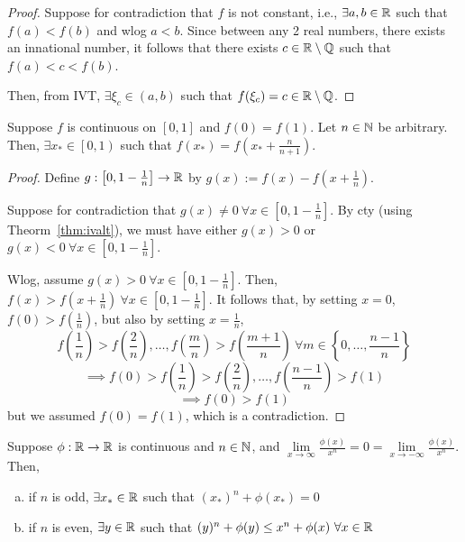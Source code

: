 \begin{proof}
    Suppose for contradiction that $f$ is not constant, i.e., $\exists a, b \in \mathbb R$ such that $f(a) < f(b)$ and wlog $a < b$.
    Since between any 2 real numbers, there exists an innational number, it follows that there exists $c \in \mathbb R \setminus \mathbb Q$ such that $f(a) < c < f(b)$.

    Then, from IVT, $\exists \xi_c \in (a, b)$ such that $f(\xi_c) = c \in \mathbb R \setminus \mathbb Q$.
\end{proof}

\begin{example}
    Suppose $f$ is continuous on $\left[0, 1\right]$ and $f(0) = f(1)$. Let $n \in \mathbb N$ be arbitrary.
    Then, $\exists x_* \in \left[0, 1\right)$ such that $f(x_*) = f\left(x_* + \frac{n}{n+1}\right)$. 
\end{example}

\begin{proof}
    Define $g: \left[0, 1 - \frac{1}{n}\right] \to \mathbb R$ by $g(x) := f(x) - f\left(x + \frac{1}{n}\right)$.

    Suppose for contradiction that $g(x) \neq 0\ \forall x \in \left[0, 1 - \frac{1}{n}\right]$.
    By cty (using Theorm~\ref{thm:ivalt}), we must have either $g(x) > 0$ or $g(x) < 0\ \forall x \in \left[0, 1 - \frac{1}{n}\right]$.

    Wlog, assume $g(x) > 0\ \forall x \in \left[0, 1 - \frac{1}{n}\right]$.
    Then, $f(x) > f\left(x + \frac{1}{n}\right)\ \forall x \in \left[0, 1 - \frac{1}{n}\right]$.
    It follows that, by setting $x=0$, $f(0) > f\left(\frac{1}{n}\right)$, but also by setting $x = \frac{1}{n}$,
    $$f\left(\frac{1}{n}\right) > f\left(\frac{2}{n}\right), \ldots, f\left(\frac{m}{n}\right) > f\left(\frac{m + 1}{n}\right)\ \forall m \in \left\{0, \ldots, \frac{n-1}{n}\right\}$$
    $$\implies f(0) > f\left(\frac{1}{n}\right) > f\left(\frac{2}{n}\right), \ldots, f\left(\frac{n-1}{n}\right) > f\left(1\right)$$
    $$\implies f(0) > f(1)$$
    but we assumed $f(0) = f(1)$, which is a contradiction.
\end{proof}

\begin{example}
    Suppose $\phi : \mathbb R \to \mathbb R$ is continuous and $n \in \mathbb N$, and $\lim\limits_{x \to \infty}\frac{\phi(x)}{x^n} = 0 = \lim\limits_{x \to -\infty}\frac{\phi(x)}{x^n}$.
    Then,
    \begin{enumerate}[(a)]
        \item if $n$ is odd, $\exists x_* \in \mathbb R$ such that $(x_*)^n + \phi(x_*) = 0$
        \item if $n$ is even, $\exists y \in \mathbb R$ such that $(y)^n + \phi(y) \leq x^n + \phi(x)\ \forall x \in \mathbb R$
    \end{enumerate}
\end{example}

